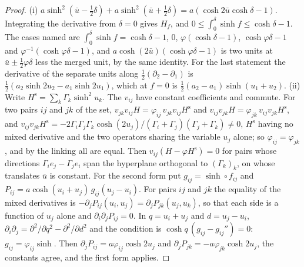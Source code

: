 \begin{proof}
(i) $a\sinh^2(\bar u-\tfrac12\delta)+a\sinh^2(\bar u+\tfrac12\delta)=a(\cosh2\bar u\cosh\delta-1)$.
Integrating the derivative from $\delta=0$ gives $H_f$, and
$0\le\int_0^\delta\sinh f\le\cosh\delta-1$. The cases named are
$\int_0^\delta\sinh f=\cosh\delta-1$, $0$, $\varphi(\cosh\delta-1)$,
$\cosh\varphi\delta-1$ and $\varphi^{-1}(\cosh\varphi\delta-1)$, and
$a\cosh(2\bar u)(\cosh\varphi\delta-1)$ is two units at
$\bar u\pm\tfrac12\varphi\delta$ less the merged unit, by the same
identity. For the last statement the derivative of the
separate units along $\tfrac12(\partial_2-\partial_1)$ is
$\tfrac12(a_2\sinh2u_2-a_1\sinh2u_1)$, which at $f=0$ is
$\tfrac12(a_2-a_1)\sinh(u_1+u_2)$. (ii) Write
$H^{\mathrm s}=\sum_k\Gamma_k\sinh^2u_k$. The $v_{ij}$ have constant
coefficients and commute. For two pairs $ij$ and $jk$ of the set,
$v_{jk}v_{ij}H=\varphi_{ij}\,v_{jk}v_{ij}H^{\mathrm s}$ and
$v_{ij}v_{jk}H=\varphi_{jk}\,v_{ij}v_{jk}H^{\mathrm s}$, and
$v_{ij}v_{jk}H^{\mathrm s}=-2\Gamma_i\Gamma_j\Gamma_k\cosh(2u_j)/(\Gamma_i+\Gamma_j)(\Gamma_j+\Gamma_k)\ne0$,
$H^{\mathrm s}$ having no mixed derivative and the two operators sharing
the variable $u_j$ alone; so $\varphi_{ij}=\varphi_{jk}$, and by the
linking all are equal. Then $v_{ij}(H-\varphi H^{\mathrm s})=0$ for pairs
whose directions $\Gamma_ie_j-\Gamma_je_i$ span the hyperplane orthogonal
to $(\Gamma_k)_k$, on whose translates $\bar u$ is constant. For the
second form put $g_{ij}=\sinh\circ f_{ij}$ and
$P_{ij}=a\cosh(u_i+u_j)\,g_{ij}(u_j-u_i)$. For pairs $ij$ and $jk$ the
equality of the mixed derivatives is
$-\partial_jP_{ij}(u_i,u_j)=\partial_jP_{jk}(u_j,u_k)$, so that each side
is a function of $u_j$ alone and $\partial_i\partial_jP_{ij}=0$. In
$q=u_i+u_j$ and $d=u_j-u_i$,
$\partial_i\partial_j=\partial^2/\partial q^2-\partial^2/\partial d^2$
and the condition is $\cosh q\,(g_{ij}-g_{ij}'')=0$: $g_{ij}=\varphi_{ij}\sinh$.
Then $\partial_jP_{ij}=a\varphi_{ij}\cosh2u_j$ and
$\partial_jP_{jk}=-a\varphi_{jk}\cosh2u_j$, the constants agree, and the
first form applies.
\end{proof}

